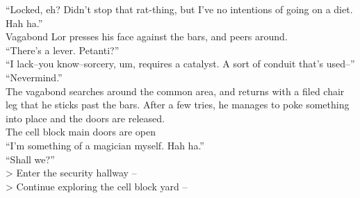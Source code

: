 “Locked, eh? Didn’t stop that rat-thing, but I’ve no intentions of going on a diet. Hah ha.”\\

Vagabond Lor presses his face against the bars, and peers around.\\
“There’s a lever. Petanti?”\\

“I lack--you know--sorcery, um, requires a catalyst. A sort of conduit that’s used--”\\

“Nevermind.”\\
The vagabond searches around the common area, and returns with a filed chair leg that he sticks past the bars. After a few tries, he manages to poke something into place and the doors are released.\\
 The cell block main doors are open\\

“I’m something of a magician myself. Hah ha.”\\

“Shall we?”\\

> Enter the security hallway -- \\
> Continue exploring the cell block yard -- 